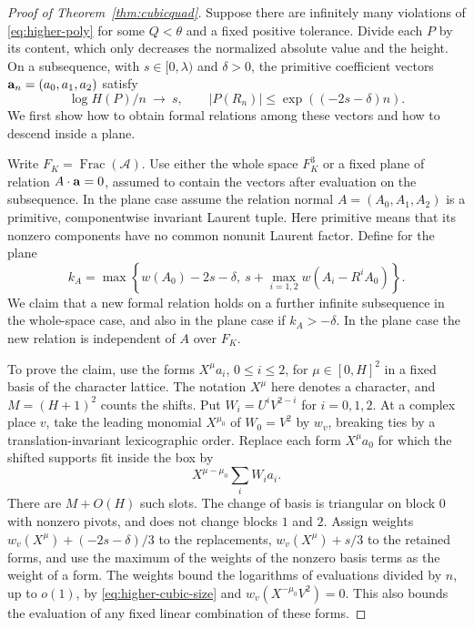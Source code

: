 \documentclass[11pt,a4paper,reqno]{amsart}
\theoremstyle{definition}
\theoremstyle{remark}
\numberwithin{equation}{section}
\begin{document}
\begin{proof}[Proof of Theorem~\ref{thm:cubicquad}]
Suppose there are infinitely many violations of
\eqref{eq:higher-poly} for some \(Q<\theta\) and a fixed
positive tolerance. Divide each \(P\) by its content,
which only decreases the normalized absolute value
and the height. On a subsequence, with \(s\in[0,\lambda)\)
and \(\delta>0\), the primitive coefficient vectors
\({\bf a}_n=(a_0,a_1,a_2)\) satisfy
\begin{equation}\label{eq:higher-cubic-size}
 \log H(P)/n\ \longrightarrow\ s,\qquad
 |P(R_n)|\le \exp((-2s-\delta)n).
\end{equation}
We first show how to obtain formal relations among
these vectors and how to descend inside a plane.

Write \(F_K=\operatorname{Frac}(\mathcal A)\).
Use either the whole space \(F_K^3\) or a fixed plane
of relation \(A\cdot{\bf a}=0\), assumed to contain the
vectors after evaluation on the subsequence. In the
plane case assume the relation normal
\(A=(A_0,A_1,A_2)\) is a primitive, componentwise invariant
Laurent tuple. Here primitive means that its nonzero
components have no common nonunit Laurent factor.
Define for the plane
\begin{equation}\label{eq:higher-cubic-k}
 k_A=\max\!\left\{
    w(A_0)-2s-\delta,\ 
    s+\max_{i=1,2} w(A_i-R^i A_0)
 \right\}.
\end{equation}
We claim that a new formal relation holds on a further
infinite subsequence in the whole-space case, and also in
the plane case if \(k_A>-\delta\). In the plane case
the new relation is independent of \(A\) over \(F_K\).

To prove the claim, use the forms \(X^\mu a_i\),
\(0\le i\le2\), for \(\mu\in[0,H]^2\) in a fixed
basis of the character lattice. The notation \(X^\mu\)
here denotes a character, and \(M=(H+1)^2\) counts
the shifts. Put \(W_i=U^iV^{2-i}\) for \(i=0,1,2\).
At a complex place \(v\), take the leading monomial
\(X^{\mu_0}\) of \(W_0=V^2\) by \(w_v\), breaking
ties by a translation-invariant lexicographic order.
Replace each form \(X^\mu a_0\) for which the shifted
supports fit inside the box by
\[
                  X^{\mu-\mu_0}\sum_i W_i a_i .
\]
There are \(M+O(H)\) such slots. The change of basis
is triangular on block \(0\) with nonzero pivots,
and does not change blocks \(1\) and \(2\).
Assign weights \(w_v(X^\mu)+(-2s-\delta)/3\) to
the replacements, \(w_v(X^\mu)+s/3\) to the retained
forms, and use the maximum of the weights of the
nonzero basis terms as the weight of a form.
The weights bound the logarithms of evaluations
divided by \(n\), up to \(o(1)\), by
\eqref{eq:higher-cubic-size} and
\(w_v(X^{-\mu_0}V^2)=0\). This also bounds the
evaluation of any fixed linear combination of
these forms.


\end{proof}
\end{document}
